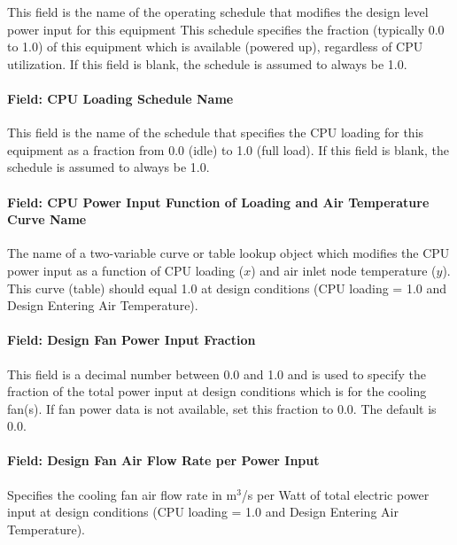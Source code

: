 This field is the name of the operating schedule that modifies the design level power input for this equipment This schedule specifies the fraction (typically 0.0 to 1.0) of this equipment which is available (powered up), regardless of CPU utilization. If this field is blank, the schedule is assumed to always be 1.0.

\paragraph{Field: CPU Loading Schedule Name}\label{field-cpu-loading-schedule-name}

This field is the name of the schedule that specifies the CPU loading for this equipment as a fraction from 0.0 (idle) to 1.0 (full load). If this field is blank, the schedule is assumed to always be 1.0.

\paragraph{Field: CPU Power Input Function of Loading and Air Temperature Curve Name}\label{field-cpu-power-input-function-of-loading-and-air-temperature-curve-name}

The name of a two-variable curve or table lookup object which modifies the CPU power input as a function of CPU loading ($x$) and air inlet node temperature ($y$). This curve (table) should equal 1.0 at design conditions (CPU loading = 1.0 and Design Entering Air Temperature).

\paragraph{Field: Design Fan Power Input Fraction}\label{field-design-fan-power-input-fraction}

This field is a decimal number between 0.0 and 1.0 and is used to specify the fraction of the total power input at design conditions which is for the cooling fan(s). If fan power data is not available, set this fraction to 0.0. The default is 0.0.

\paragraph{Field: Design Fan Air Flow Rate per Power Input}\label{field-design-fan-air-flow-rate-per-power-input}

Specifies the cooling fan air flow rate in m$^3$/s per Watt of total electric power input at design conditions (CPU loading = 1.0 and Design Entering Air Temperature).

